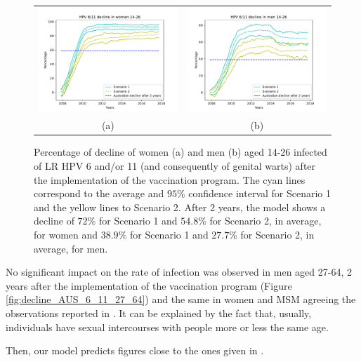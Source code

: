 \begin{figure}[!]
	\centering
	\begin{tabular}{cc}
		\includegraphics[width=0.45\linewidth]{IMGs/3.-Australia/decline_14_26_verr_muj.pdf}	& 
		\includegraphics[width=0.45\linewidth]{IMGs/3.-Australia/decline_14_26_verr_hom.pdf}  \\ 
		(a)	& (b) 
	\end{tabular} 
	\caption{Percentage of decline of women (a) and men (b) aged 14-26 infected of LR HPV 6 and/or 11 (and consequently of genital warts) after the implementation of the vaccination program. The cyan lines correspond to the average and $95\%$ confidence interval for Scenario 1 and the yellow lines to Scenario 2. After 2 years, the model shows a decline of $72\%$ for Scenario 1 and $54.8\%$ for Scenario 2, in average, for women and $38.9\%$ for Scenario 1 and $27.7\%$ for Scenario 2, in average, for men.}
	\label{fig:decline_AUS_6_11}
\end{figure}

No significant impact on the rate of infection was observed in men aged 27-64, 2 years after the implementation of the vaccination program (Figure \ref{fig:decline_AUS_6_11_27_64}) and the same in women and MSM agreeing the observations reported in \cite{ali2013genital}. It can be explained by the fact that, usually, individuals have sexual intercourses with people more or less the same age. 

Then, our model predicts figures close to the ones given in \cite{ali2013genital}.

